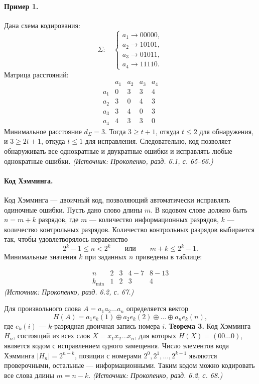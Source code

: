 \documentclass[a4paper,12pt]{article}
\begin{document}
\paragraph{Пример 1.}
Дана схема кодирования:
\[
\Sigma:\quad
\begin{cases}
a_1\to 00000,\\
a_2\to 10101,\\
a_3\to 01011,\\
a_4\to 11110.
\end{cases}
\]
Матрица расстояний:
\[
\begin{array}{c|cccc}
 & a_1 & a_2 & a_3 & a_4\\
\hline
a_1 & 0 & 3 & 3 & 4\\
a_2 & 3 & 0 & 4 & 3\\
a_3 & 3 & 4 & 0 & 3\\
a_4 & 4 & 3 & 3 & 0
\end{array}
\]
Минимальное расстояние \(d_\Sigma=3\). Тогда \(3\ge t+1\), откуда \(t\le2\) для обнаружения, и \(3\ge 2t+1\), откуда \(t\le1\) для исправления. Следовательно, код позволяет обнаруживать все однократные и двукратные ошибки и исправлять любые однократные ошибки.
\textit{(Источник: Прокопенко, разд. 6.1, с. 65--66.)}

\paragraph{Код Хэмминга.}
Код Хэмминга — двоичный код, позволяющий автоматически исправлять одиночные ошибки. Пусть дано слово длины \(m\). В кодовом слове должно быть \(n=m+k\) разрядов, где \(m\) — количество информационных разрядов, \(k\) — количество контрольных разрядов. Количество контрольных разрядов выбирается так, чтобы удовлетворялось неравенство
\[
2^k-1\le n<2^k
\qquad\text{или}\qquad
m+k\le2^k-1.
\]
Минимальные значения \(k\) при заданных \(n\) приведены в таблице:

\[
\begin{array}{c|cccc}
n & 2 & 3 & 4-7 & 8-13\\
\hline
k_{\min} & 1 & 2 & 3 & 4
\end{array}
\]
\textit{(Источник: Прокопенко, разд. 6.2, с. 67.)}

Для произвольного слова \(A=a_1a_2\dots a_n\) определяется вектор
\[
H(A)=a_1e_k(1)\oplus a_2e_k(2)\oplus\dots\oplus a_ne_k(n),
\]
где \(e_k(i)\) — \(k\)-разрядная двоичная запись номера \(i\). \textbf{Теорема 3.} Код Хэмминга \(H_n\), состоящий из всех слов \(X=x_1x_2\dots x_n\), для которых \(H(X)=(00\dots0)\), является кодом с исправлением одного замещения. Число элементов кода Хэмминга \(|H_n|=2^{n-k}\), позиции с номерами \(2^0,2^1,\dots,2^{k-1}\) являются проверочными, остальные — информационными. Таким кодом можно кодировать все слова длины \(m=n-k\).
\textit{(Источник: Прокопенко, разд. 6.2, с. 68.)}
\end{document}
